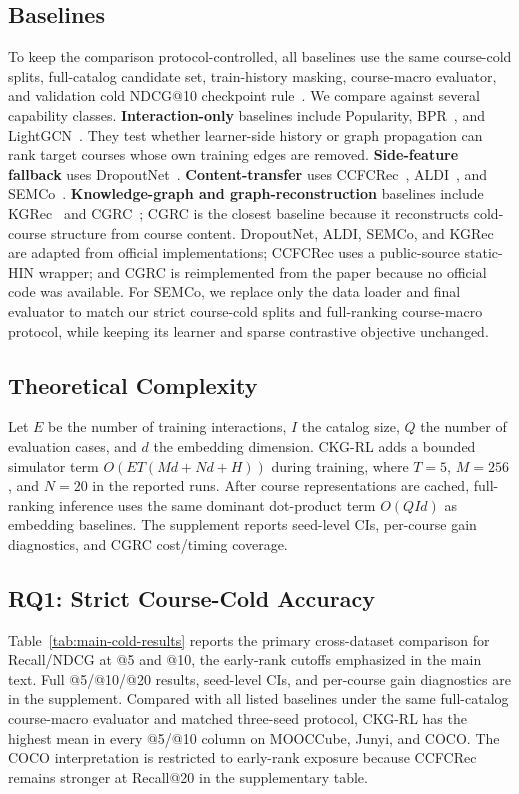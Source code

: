 \documentclass[letterpaper]{article}
\begin{document}
\subsection{Baselines}
To keep the comparison protocol-controlled, all baselines use the same course-cold splits, full-catalog candidate set, train-history masking, course-macro evaluator, and validation cold NDCG@10 checkpoint rule~\cite{sun2020rigorous,hidasi2023flaws}. We compare against several capability classes. \textbf{Interaction-only} baselines include Popularity, BPR~\cite{rendle2009bpr}, and LightGCN~\cite{he2020lightgcn}. They test whether learner-side history or graph propagation can rank target courses whose own training edges are removed. \textbf{Side-feature fallback} uses DropoutNet~\cite{volkovs2017dropoutnet}. \textbf{Content-transfer} uses CCFCRec~\cite{zhou2023ccfcrec}, ALDI~\cite{huang2023aldi}, and SEMCo~\cite{meehan2026semco}. \textbf{Knowledge-graph and graph-reconstruction} baselines include KGRec~\cite{yang2023knowledge} and CGRC~\cite{kim2024cgrc}; CGRC is the closest baseline because it reconstructs cold-course structure from course content. DropoutNet, ALDI, SEMCo, and KGRec are adapted from official implementations; CCFCRec uses a public-source static-HIN wrapper; and CGRC is reimplemented from the paper because no official code was available. For SEMCo, we replace only the data loader and final evaluator to match our strict course-cold splits and full-ranking course-macro protocol, while keeping its learner and sparse contrastive objective unchanged.

\subsection{Theoretical Complexity}
Let \(E\) be the number of training interactions, \(I\) the catalog size, \(Q\) the number of evaluation cases, and \(d\) the embedding dimension. CKG-RL adds a bounded simulator term \(O(E T(Md+Nd+H))\) during training, where \(T=5\), \(M=256\), and \(N=20\) in the reported runs. After course representations are cached, full-ranking inference uses the same dominant dot-product term \(O(QId)\) as embedding baselines. The supplement reports seed-level CIs, per-course gain diagnostics, and CGRC cost/timing coverage.

\subsection{RQ1: Strict Course-Cold Accuracy}
Table~\ref{tab:main-cold-results} reports the primary cross-dataset comparison for Recall/NDCG at @5 and @10, the early-rank cutoffs emphasized in the main text. Full @5/@10/@20 results, seed-level CIs, and per-course gain diagnostics are in the supplement. Compared with all listed baselines under the same full-catalog course-macro evaluator and matched three-seed protocol, CKG-RL has the highest mean in every @5/@10 column on MOOCCube, Junyi, and COCO. The COCO interpretation is restricted to early-rank exposure because CCFCRec remains stronger at Recall@20 in the supplementary table.
\end{document}
